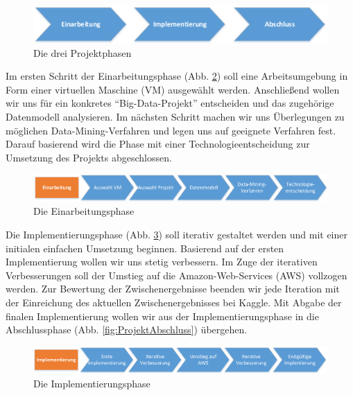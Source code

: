 \begin{figure}[H]
\centering
\includegraphics[width=0.8\linewidth]{Bilder/ProjektplanAllgemein}
\caption{Die drei Projektphasen}
\label{fig:ProjektplanAllgemein}
\end{figure}

Im ersten Schritt der Einarbeitungsphase (Abb. \ref{fig:ProjektEinarbeitung}) soll eine Arbeitsumgebung in Form einer virtuellen Maschine (VM) ausgewählt werden. Anschließend wollen wir uns für ein konkretes "`Big-Data-Projekt"' entscheiden und das zugehörige Datenmodell analysieren. Im nächsten Schritt machen wir uns Überlegungen zu möglichen Data-Mining-Verfahren und legen uns auf geeignete Verfahren fest. Darauf basierend wird die Phase mit einer Technologieentscheidung zur Umsetzung des Projekts abgeschlossen.

\begin{figure}[h]
\centering
\includegraphics[width=1\linewidth]{Bilder/ProjektEinarbeitung}
\caption{Die Einarbeitungsphase}
\label{fig:ProjektEinarbeitung}
\end{figure}

Die Implementierungsphase (Abb. \ref{fig:ProjektImplementierung}) soll iterativ gestaltet werden und mit einer initialen einfachen Umsetzung beginnen. Basierend auf der ersten Implementierung wollen wir uns stetig verbessern. Im Zuge der iterativen Verbesserungen soll der Umstieg auf die Amazon-Web-Services (AWS) vollzogen werden. Zur Bewertung der Zwischenergebnisse beenden wir jede Iteration mit der Einreichung des aktuellen Zwischenergebnisses bei Kaggle. Mit Abgabe der finalen Implementierung wollen wir aus der Implementierungsphase in die Abschlussphase (Abb. \ref{fig:ProjektAbschluss}) übergehen.

\begin{figure}[h]
\centering
\includegraphics[width=1\linewidth]{Bilder/ProjektImplementierung}
\caption{Die Implementierungsphase}
\label{fig:ProjektImplementierung}
\end{figure}

